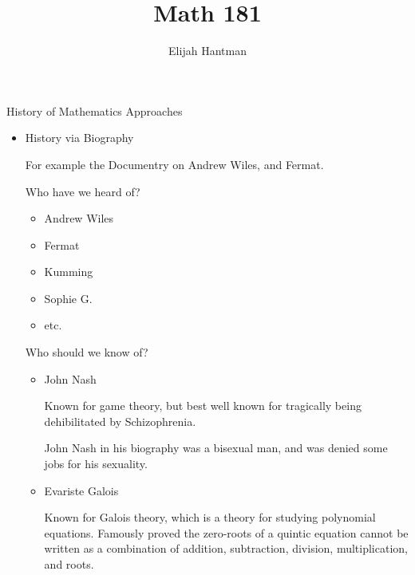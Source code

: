 \documentclass{report}
\title{\Huge{Math 181}}
\author{\huge{Elijah Hantman}}
\date{}
\begin{document}
\maketitle
\newpage

\begin{description}
    \item {\large History of Mathematics Approaches}
        \begin{itemize}
            \item History via Biography
                \begin{mdframed}
                   For example the Documentry on Andrew Wiles,
                   and Fermat.

                   Who have we heard of?
                   \begin{itemize}
                       \item Andrew Wiles
                       \item Fermat
                       \item Kumming
                       \item Sophie G.
                       \item etc.
                   \end{itemize}

                   Who should we know of?
                   \begin{itemize}
                       \item John Nash
                           \begin{mdframed}
                               Known for game theory, but best
                               well known for tragically being
                               dehibilitated by Schizophrenia.

                               \vspace{10pt}

                               John Nash in his biography was a
                               bisexual man, and was denied
                               some jobs for his sexuality.
                           \end{mdframed}
                       \item Evariste Galois
                           \begin{mdframed}
                               Known for Galois theory, which
                               is a theory for studying polynomial
                               equations. Famously proved the zero-roots
                               of a quintic equation cannot be written
                               as a combination of addition, subtraction,
                               division, multiplication, and roots.


\end{mdframed}
\end{itemize}
\end{mdframed}
\end{itemize}
\end{description}
\end{document}
